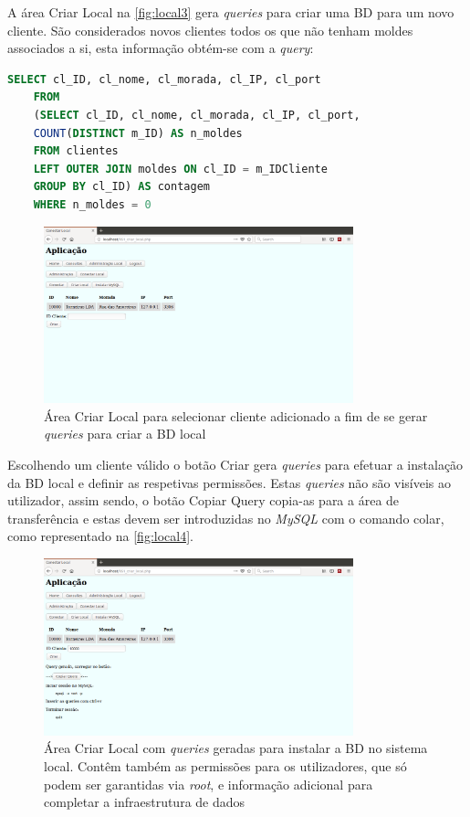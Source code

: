 \documentclass[11pt,twoside,a4paper]{report}
\begin{document}
A área Criar Local na \autoref{fig:local3} gera \textit{queries} para criar uma BD para um novo cliente. São considerados novos clientes todos os que não tenham moldes associados a si, esta informação obtém-se com a \textit{query}:
\begin{lstlisting}[language = SQL]
	SELECT cl_ID, cl_nome, cl_morada, cl_IP, cl_port
	FROM
	(SELECT cl_ID, cl_nome, cl_morada, cl_IP, cl_port,
	COUNT(DISTINCT m_ID) AS n_moldes
	FROM clientes
	LEFT OUTER JOIN moldes ON cl_ID = m_IDCliente
	GROUP BY cl_ID) AS contagem
	WHERE n_moldes = 0
\end{lstlisting}
\begin{figure}[H]
	\centering
	\includegraphics[trim={0 11cm 0 0},clip,width=0.8\textwidth]{local02} %
	\caption[Área Criar Local]{Área Criar Local para selecionar cliente adicionado a fim de se gerar \textit{queries} para criar a BD local}
	\label{fig:local3}
\end{figure}
Escolhendo um cliente válido o botão Criar gera \textit{queries} para efetuar a instalação da BD local e definir as respetivas permissões. Estas \textit{queries} não são visíveis ao utilizador, assim sendo, o botão Copiar Query copia-as para a área de transferência e estas devem ser introduzidas no \textit{MySQL} com o comando colar, como representado na \autoref{fig:local4}.
\begin{figure}[H]
	\begin{center}
		\includegraphics[trim={0 2cm 0 0},clip,width=0.8\textwidth]{local03} %
		\caption[Área Criar Local com \textit{queries geradas}]{Área Criar Local com \textit{queries} geradas para instalar a BD no sistema local. Contêm também as permissões para os utilizadores, que só podem ser garantidas via \textit{root}, e informação adicional para completar a infraestrutura de dados}
		\label{fig:local4}
	\end{center}
\end{figure}
\end{document}
